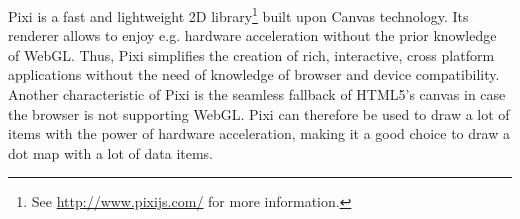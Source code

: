 \ac{Pixi} is a fast and lightweight 2D library\footnote{See \href{http://www.pixijs.com/}{http://www.pixijs.com/} for more information.} built upon Canvas technology. Its renderer allows to enjoy e.g. hardware acceleration without the prior knowledge of \ac{WebGL}. Thus, \ac{Pixi} simplifies the creation of rich, interactive, cross platform applications without the need of knowledge of browser and device compatibility. Another characteristic of \ac{Pixi} is the seamless fallback of HTML5's canvas in case the browser is not supporting \ac{WebGL}.
\ac{Pixi} can therefore be used to draw a lot of items with the power of hardware acceleration, making it a good choice to draw a dot map with a lot of data items.